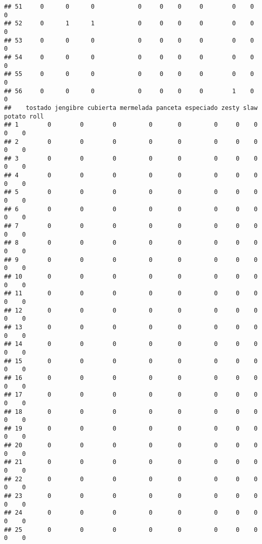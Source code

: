 \documentclass[
]{article}
\begin{document}
\begin{verbatim}
## 51     0      0      0            0     0    0     0        0    0       0
## 52     0      1      1            0     0    0     0        0    0       0
## 53     0      0      0            0     0    0     0        0    0       0
## 54     0      0      0            0     0    0     0        0    0       0
## 55     0      0      0            0     0    0     0        0    0       0
## 56     0      0      0            0     0    0     0        1    0       0
##    tostado jengibre cubierta mermelada panceta especiado zesty slaw potato roll
## 1        0        0        0         0       0         0     0    0      0    0
## 2        0        0        0         0       0         0     0    0      0    0
## 3        0        0        0         0       0         0     0    0      0    0
## 4        0        0        0         0       0         0     0    0      0    0
## 5        0        0        0         0       0         0     0    0      0    0
## 6        0        0        0         0       0         0     0    0      0    0
## 7        0        0        0         0       0         0     0    0      0    0
## 8        0        0        0         0       0         0     0    0      0    0
## 9        0        0        0         0       0         0     0    0      0    0
## 10       0        0        0         0       0         0     0    0      0    0
## 11       0        0        0         0       0         0     0    0      0    0
## 12       0        0        0         0       0         0     0    0      0    0
## 13       0        0        0         0       0         0     0    0      0    0
## 14       0        0        0         0       0         0     0    0      0    0
## 15       0        0        0         0       0         0     0    0      0    0
## 16       0        0        0         0       0         0     0    0      0    0
## 17       0        0        0         0       0         0     0    0      0    0
## 18       0        0        0         0       0         0     0    0      0    0
## 19       0        0        0         0       0         0     0    0      0    0
## 20       0        0        0         0       0         0     0    0      0    0
## 21       0        0        0         0       0         0     0    0      0    0
## 22       0        0        0         0       0         0     0    0      0    0
## 23       0        0        0         0       0         0     0    0      0    0
## 24       0        0        0         0       0         0     0    0      0    0
## 25       0        0        0         0       0         0     0    0      0    0

\end{verbatim}
\end{document}
